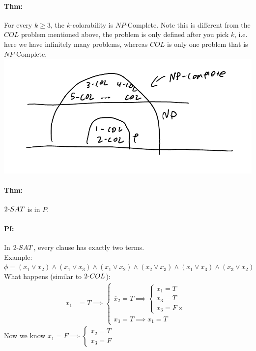\documentclass[12 pt]{article}
\begin{document}
          \paragraph{Thm:} For every $k\geq 3$, the $k$-colorability
          is $NP$-Complete. Note this is different from the $COL$
          problem mentioned above, the problem is only defined after
          you pick $k$, i.e. here we have infinitely many problems,
          whereas $COL$ is only one problem that is $NP$-Complete.
          \\\includegraphics[width=.9\textwidth]{i141.pdf}
          \paragraph{Thm:} $2\hbox{-}SAT$ is in $P$.
          \paragraph{Pf:} In $2\hbox{-}SAT$, every clause has exactly
          two terms.
          \\ Example: $\phi = (x_1 \lor x_2) \land (x_1 \lor
          \overline{x}_3) \land (\overline{x}_1 \lor \overline{x}_2)
          \land (x_2 \lor x_3) \land (\overline{x}_1 \lor x_3) \land
          (\overline{x}_3 \lor x_2)$
          \\ What happens (similar to $2\hbox{-}COL$):
          \begin{align*}
            x_1 & = T \implies
                  \begin{cases}
                    \overline{x}_2 = T \implies
                    \begin{cases}
                      x_1 = T
                      \\ x_3 = T
                      \\ x_3 = F \times
                    \end{cases}
                    \\ x_3 = T \implies x_1 = T
                  \end{cases}
          \end{align*}
          Now we know $x_1 = F \implies
          \begin{cases}
            x_2 = T
            \\ x_3 = F
          \end{cases}
$
        
\end{document}
